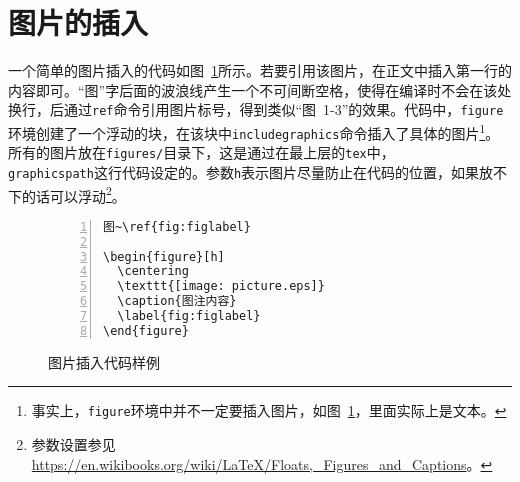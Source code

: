 %
%
%
%
%
%
%

\section{图片的插入}

一个简单的图片插入的代码如图~\ref{fig:fig_code}所示。若要引用该图片，在正文中插入第一行的内容即可。``图''字后面的波浪线产生一个不可间断空格，使得在编译时不会在该处换行，后通过\texttt{ref}命令引用图片标号，得到类似``图~1-3''的效果。代码中，\texttt{figure}环境创建了一个浮动的块，在该块中\texttt{includegraphics}命令插入了具体的图片\footnote{事实上，\texttt{figure}环境中并不一定要插入图片，如图~\ref{fig:fig_code}，里面实际上是文本。}。
所有的图片放在\texttt{figures/}目录下，这是通过在最上层的\texttt{tex}中，\texttt{\\graphicspath{}}这行代码设定的。参数\texttt{h}表示图片尽量防止在代码的位置，如果放不下的话可以浮动\footnote{参数设置参见\url{https://en.wikibooks.org/wiki/LaTeX/Floats,_Figures_and_Captions}。}。

\begin{figure}[h]
  {
  \fontsize{10pt}{12pt}\selectfont
  \setmainfont{Courier New}
  \begin{lstlisting}[showstringspaces=false,numbers=left,xleftmargin=3em]
图~\ref{fig:figlabel}

\begin{figure}[h]
  \centering
  \texttt{[image: picture.eps]}
  \caption{图注内容}
  \label{fig:figlabel}
\end{figure}

  \end{lstlisting}
  }
\caption{图片插入代码样例}
\label{fig:fig_code}
\end{figure}

